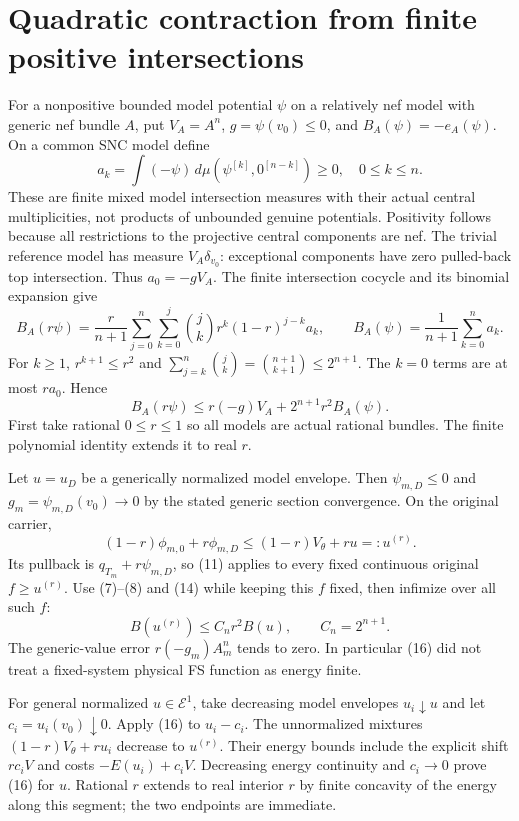\documentclass[10pt]{article}
\begin{document}
\section{Quadratic contraction from finite positive intersections}
For a nonpositive bounded model potential $\psi$ on a relatively nef
model with generic nef bundle $A$, put $V_A=A^n$, $g=\psi(v_0)\leq0$,
and $B_A(\psi)=-e_A(\psi)$. On a common SNC model define
\[
 a_k=\int(-\psi)\,d\mu(\psi^{[k]},0^{[n-k]})\geq0,
                         \quad 0\leq k\leq n.           \tag{12}
\]
These are finite mixed model intersection measures with their actual
central multiplicities, not products of unbounded genuine potentials.
Positivity follows because all restrictions to the projective central
components are nef. The trivial reference model has measure
$V_A\delta_{v_0}$: exceptional components have zero pulled-back top
intersection. Thus $a_0=-gV_A$.
The finite intersection cocycle and its binomial expansion give
\[
 B_A(r\psi)=\frac r{n+1}\sum_{j=0}^n\sum_{k=0}^j
    \binom jk r^k(1-r)^{j-k}a_k,
             \qquad B_A(\psi)=\frac1{n+1}\sum_{k=0}^n a_k.         \tag{13}
\]
For $k\geq1$, $r^{k+1}\leq r^2$ and
$\sum_{j=k}^n\binom jk=\binom{n+1}{k+1}\leq2^{n+1}$.
The $k=0$ terms are at most $ra_0$. Hence
\[
 B_A(r\psi)\leq r(-g)V_A+2^{n+1}r^2B_A(\psi).          \tag{14}
\]
First take rational $0\leq r\leq1$ so all models are actual rational
bundles. The finite polynomial identity extends it to real $r$.

Let $u=u_D$ be a generically normalized model envelope. Then
$\psi_{m,D}\leq0$ and $g_m=\psi_{m,D}(v_0)\to0$ by the stated
generic section convergence. On the original carrier,
\[
 (1-r)\phi_{m,0}+r\phi_{m,D}
                          \leq(1-r)V_\theta+ru=:u^{(r)}.           \tag{15}
\]
Its pullback is $q_{T_m}+r\psi_{m,D}$, so (11) applies to every
fixed continuous original $f\geq u^{(r)}$. Use (7)--(8) and (14)
while keeping this $f$ fixed, then infimize over all such $f$:
\[
                   B(u^{(r)})\leq C_n r^2B(u),
                            \qquad C_n=2^{n+1}.         \tag{16}
\]
The generic-value error $r(-g_m)A_m^n$ tends to zero. In particular
(16) did not treat a fixed-system physical FS function as energy finite.

For general normalized $u\in\mathcal E^1$, take decreasing model
envelopes $u_i\downarrow u$ and let $c_i=u_i(v_0)\downarrow0$.
Apply (16) to $u_i-c_i$. The unnormalized mixtures
$(1-r)V_\theta+ru_i$ decrease to $u^{(r)}$. Their energy bounds include
the explicit shift $r c_iV$ and costs $-E(u_i)+c_iV$.
Decreasing energy continuity and $c_i\to0$ prove (16) for $u$.
Rational $r$ extends to real interior $r$ by finite concavity of the
energy along this segment; the two endpoints are immediate.
\end{document}
